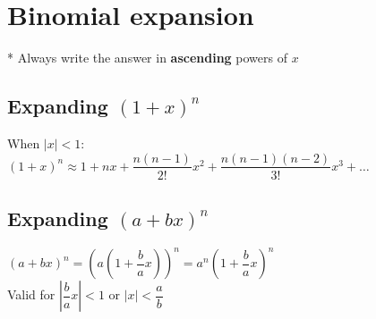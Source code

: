 \section{Binomial expansion}
* Always write the answer in \textbf{ascending} powers of $x$
\subsection{Expanding $(1+x)^n$}
When $|x|<1$:\\
$(1+x)^n\approx 1 + nx + \dfrac{n(n-1)}{2!}x^2+\dfrac{n(n-1)(n-2)}{3!}x^3+\dots$
\subsection{Expanding $(a+bx)^n$}
$(a+bx)^n = \left(a\left(1+\dfrac{b}{a}x\right)\right)^n = a^n\left(1+\dfrac{b}{a}x\right)^n$\\
Valid for $\left|\dfrac{b}{a}x\right|<1$ or $|x| < \dfrac{a}{b}$
